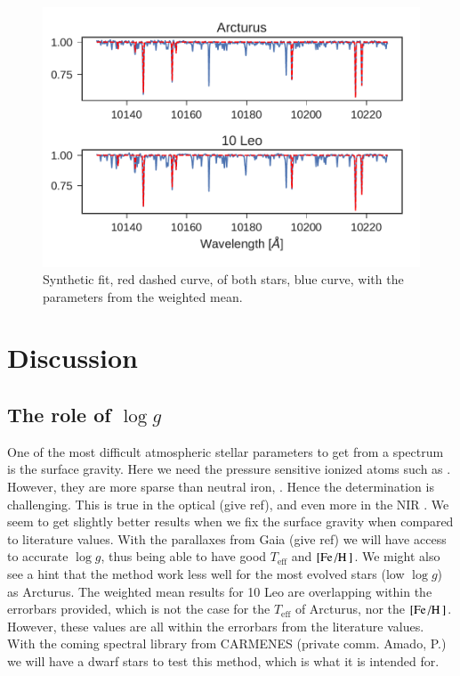 \documentclass{aa}
\begin{document}
\begin{figure}[tpb]
    \centering
    \includegraphics[width=1.0\linewidth]{figures/syntheticFit.pdf}
    \caption{Synthetic fit, red dashed curve, of both stars, blue curve, with
             the parameters from the weighted mean.}
    \label{fig:synth}
\end{figure}


\section{Discussion}
\label{sec:discussion}

\subsection{The role of $\log g$}

One of the most difficult atmospheric stellar parameters to get from a spectrum
is the surface gravity. Here we need the pressure sensitive ionized atoms such
as . However, they are more sparse than neutral iron, .
Hence the determination is challenging. This is true in the optical (give ref),
and even more in the NIR \citep[see e.g.][and this work]{Andreasen2016}. We seem
to get slightly better results when we fix the surface gravity when compared to
literature values. With the parallaxes from Gaia (give ref) we will have access
to accurate $\log g$, thus being able to have good $T_\mathrm{eff}$ and
$[\ion{Fe}/\ion{H}]$. We might also see a hint that the method work less well
for the most evolved stars (low $\log g$) as Arcturus. The weighted mean results
for 10 Leo are overlapping within the errorbars provided, which is not the case
for the $T_\mathrm{eff}$ of Arcturus, nor the $[\ion{Fe}/\ion{H}]$. However,
these values are all within the errorbars from the literature values. With the
coming spectral library from CARMENES (private comm. Amado, P.) we will have a
dwarf stars to test this method, which is what it is intended for.
\end{document}
